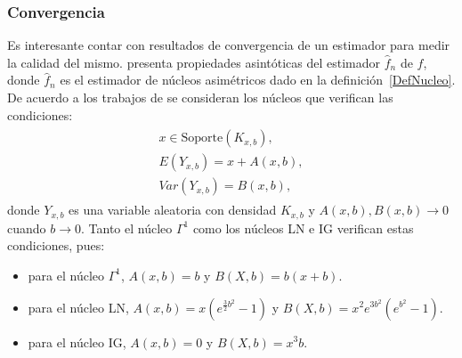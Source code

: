 



\subsubsection{Convergencia}

Es interesante contar con resultados de convergencia de un estimador para medir la calidad del mismo. \citet{Libnegue2013} presenta propiedades asintóticas del estimador $\widehat{f}_n$ de $f$, donde $\widehat{f}_n$ es el estimador de núcleos asimétricos dado en la definición~\ref{DefNucleo}. De acuerdo a los trabajos de \citet{Libnegue2013,kokonendji2018} se consideran los núcleos que verifican las condiciones: 
\begin{align}
\label{CondNucleos}
\begin{split}
x \in \text{Soporte}(K_{x,b}),\\
E(Y_{x,b})=x+A(x,b),\\
Var(Y_{x,b})=B(x,b),
\end{split}
\end{align}
donde $Y_{x,b}$ es una variable aleatoria con densidad $K_{x,b}$ y $A(x,b),B(x,b) \to 0$ cuando $b \to 0$. Tanto el núcleo $\Gamma^1$ como los núcleos LN e IG verifican estas condiciones, pues:
\begin{itemize}
	\item para el núcleo $\Gamma^1$, $A(x,b)=b$ y $B(X,b)=b(x+b)$.
	\item para el núcleo LN, $A(x,b)=x(e^{\frac{3}{2} b^2}-1)$ y $B(X,b)=x^2 e^{3b^2} (e^{b^2}-1)$.
	\item para el núcleo IG, $A(x,b)=0$ y $B(X,b)=x^3 b$.
\end{itemize}


